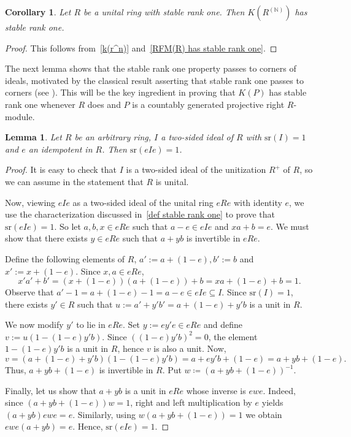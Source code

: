\documentclass[11pt]{amsart}
\numberwithin{equation}{section}
\newtheorem{lma}{Lemma}[section]
\newtheorem{cor}[corCt]{Corollary}
\theoremstyle{definition}
\theoremstyle{plain}
\theoremstyle{definition}
\begin{document}
\begin{cor} \label{k(r^N) has stable rank one}
Let $R$ be a unital ring with stable rank one. Then $K(R^{(\mathbb{N})})$ has stable rank one. 
\end{cor}

\begin{proof}
This follows from~\autoref{k(r^n)} and~\autoref{RFM(R) has stable rank one}.
\end{proof}

The next lemma shows that the stable rank one property passes to corners of ideals, motivated by the classical result asserting that stable rank one passes to corners (see \cite[Theorem 2.8]{Vaserstein84StRangeCond}). This will be the key ingredient in proving that $K(P)$ has stable rank one whenever $R$ does and $P$ is a countably generated projective right $R$-module.

\begin{lma} \label{lema corner stable rank one}
Let $R$ be an arbitrary ring, $I$ a two-sided ideal of $R$ with $\mathrm{sr}(I) = 1$ and $e$ an idempotent in $R$. Then $\mathrm{sr}(eIe) = 1$. 
\end{lma}

\begin{proof}
It is easy to check that $I$ is a two-sided ideal of the unitization $R^+$ of $R$, so we can assume in the statement that $R$ is unital. 

Now, viewing $eIe$ as a two-sided ideal of the unital ring $eRe$ with identity $e$, we use the characterization discussed in~\autoref{def stable rank one} to prove that $\mathrm{sr}(eIe) = 1$. So let $a,b,x \in eRe$ such that $a - e \in eIe$ and $xa + b = e$. We must show that there exists $y \in eRe$ such that $a + yb$ is invertible in $eRe$. 

Define the following elements of $R$, $a' := a + (1-e), b' := b$ and $x' := x + (1-e).$ Since $x, a \in eRe$, 
\begin{equation*}
    x'a' + b' = (x + (1-e))(a + (1-e)) + b = xa + (1-e) + b = 1.
\end{equation*}
Observe that $a' - 1 = a + (1-e) - 1 = a - e \in eIe \subseteq I.$ Since $\mathrm{sr}(I)=1$, there exists $y' \in R$ such that
$u := a' + y'b' = a + (1-e) + y'b$
is a unit in $R$.

We now modify $y'$ to lie in $eRe$. Set $y := ey'e \in eRe$ and define $v := u(1 - (1-e)y'b)$. Since $((1-e)y'b)^2 = 0$, the element $1 - (1-e)y'b$ is a unit in $R$, hence $v$ is also a unit. Now, 
\begin{equation*}
v = (a + (1-e) + y'b)(1 - (1-e)y'b) = a + ey'b + (1 - e) = a + yb + (1-e).
\end{equation*}
Thus, $a + yb + (1-e)$ is invertible in $R$. Put $w \coloneqq (a + yb + (1-e))^{-1}$. 

Finally, let us show that $a + yb$ is a unit in $eRe$ whose inverse is $ewe$. Indeed, since $(a + yb + (1-e))w = 1$, right and left multiplication by $e$ yields $(a + yb)ewe = e$. Similarly, using $w(a + yb + (1-e)) = 1$ we obtain $ewe(a+yb) = e$. Hence, $\mathrm{sr}(eIe)=1.$
\end{proof}
\end{document}
